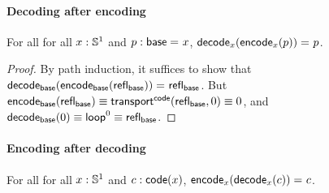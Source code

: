 \paragraph{Decoding after encoding}

\begin{lem} \label{lem:s1-decode-encode}  For all 
for all $x: \mathbb{S} ^1$ and $p : \mathsf{base} =_{} x$, $\mathsf{decode}_x({{\mathsf{encode}_x(p)}}) =_{} p$.  
\end{lem}

\begin{proof}
By path induction, it suffices to show that 
$\mathsf{decode}_{\mathsf{base}}({{\mathsf{encode}_{\mathsf{base}}(\mathsf{refl}_{\mathsf{base}})}}) =_{} \mathsf{refl}_{\mathsf{base}}$.  But
${\mathsf{encode}_{\mathsf{base}}(\mathsf{refl}_{\mathsf{base}})} \equiv 
 \mathsf{transport}^{\mathsf{code}}(\mathsf{refl}_{\mathsf{base}},0) \equiv 0$, and $\mathsf{decode}_{\mathsf{base}}(0)
 \equiv \mathsf{loop}^ 0 \equiv \mathsf{refl}_{\mathsf{base}}$.  
\end{proof}

\paragraph{Encoding after decoding}

\begin{lem} \label{lem:s1-encode-decode} For all 
for all $x: \mathbb{S} ^1$ and $c : \mathsf{code}(x)$, $\mathsf{encode}_x({{\mathsf{decode}_x(c)}}) =_{} c$.  
\end{lem}

